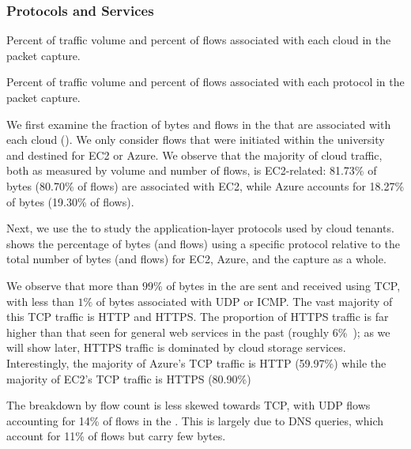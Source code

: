 \subsubsection{Protocols and Services}
\label{sec:protocols}

\begin{table}[!t]\small
\centering

\caption{Percent of traffic volume and percent of flows associated with
    each cloud in the packet capture.}
\label{tab:cloudsplit}
\end{table}

\begin{table}[!t]\small
\centering

\caption{Percent of traffic volume and percent of flows associated with each  
    protocol in the packet capture.}
\label{tab:proserv}
\end{table}

We first examine the fraction of bytes and flows in the \capturedata that are
associated with each cloud (). We only consider flows
that were initiated within the university and destined for EC2 or Azure.
We observe that the majority of cloud traffic, both as measured by volume and
number of flows, is EC2-related: 81.73\% of bytes (80.70\% of flows)
are associated with EC2, while Azure accounts for 18.27\% of bytes
(19.30\% of flows).

Next, we use the \capturedata to study the application-layer protocols used by cloud tenants.
 shows the
percentage of bytes (and flows) using a specific protocol relative to the
total number of bytes (and flows) for EC2, Azure, and the capture as a whole.

We observe that more than $99\%$ of bytes in the \captureonedata 
are sent and received using TCP, with less than $1\%$ of bytes
associated with UDP or ICMP.  The vast majority of this TCP traffic is
HTTP and HTTPS. The proportion of HTTPS traffic is far higher than
that seen for general web services in the past (roughly
6\%~\cite{agarwal2010endre}); as we will show later, HTTPS traffic is dominated
by cloud storage services. Interestingly, the majority of Azure's TCP traffic
is HTTP (59.97\%) while the majority of EC2's TCP traffic is HTTPS (80.90\%)  

The breakdown by flow count is less skewed
towards TCP, with UDP flows accounting for 14\% of flows in the
\captureonedata. This is largely due to DNS queries, which account for
11\% of flows but carry few bytes.

